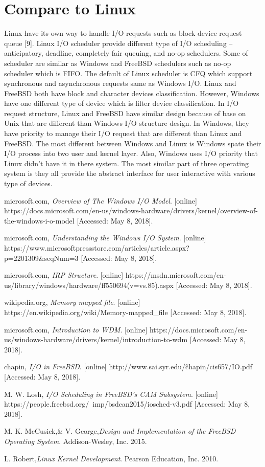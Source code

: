 \documentclass[letterpaper,draftclsnofoot,journal,compsoc,10pt,onecolumn]{IEEEtran}
\begin{document}
\section{Compare to Linux}
\indent Linux have its own way to handle I/O requests such as block device request queue [9]. Linux I/O scheduler provide different type of I/O scheduling – anticipatory, deadline, completely fair queuing, and no-op schedulers. Some of scheduler are similar as Windows and FreeBSD schedulers such as no-op scheduler which is FIFO. The default of Linux scheduler is CFQ which support synchronous and asynchronous requests same as Windows I/O. Linux and FreeBSD both have block and character devices classification. However, Windows have one different type of device which is filter device classification. In I/O request structure, Linux and FreeBSD have similar design because of base on Unix that are different than Windows I/O structure design. In Windows, they have priority to manage their I/O request that are different than Linux and FreeBSD. The most different between Windows and Linux is Windows spate their I/O process into two user and kernel layer. Also, Windows uses I/O priority that Linux didn’t have it in there system. The most similar part of three operating system is they all provide the abstract interface for user interactive with various type of devices.
   
\newpage
\begin{thebibliography}{14}

microsoft.com, \textit{Overview of The Windows I/O Model}. [online] https://docs.microsoft.com/en-us/windows-hardware/drivers/kernel/overview-of-the-windows-i-o-model [Accessed: May 8, 2018].

microsoft.com, \textit{Understanding the Windows I/O System}. [online]  https://www.microsoftpressstore.com/articles/article.aspx?p=2201309\&seqNum=3 [Accessed: May 8, 2018].

microsoft.com, \textit{IRP Structure}. [online]  https://msdn.microsoft.com/en-us/library/windows/hardware/ff550694(v=vs.85).aspx [Accessed: May 8, 2018].

wikipedia.org, \textit{Memory mapped file}. [online]  https://en.wikipedia.org/wiki/Memory-mapped\_file [Accessed: May 8, 2018].

microsoft.com, \textit{Introduction to WDM}. [online]  https://docs.microsoft.com/en-us/windows-hardware/drivers/kernel/introduction-to-wdm [Accessed: May 8, 2018].

chapin, \textit{I/O in FreeBSD}. [online]  http://www.sai.syr.edu/\~chapin/cis657/IO.pdf [Accessed: May 8, 2018].

M. W. Losh, \textit{I/O Scheduling in FreeBSD’s CAM Subsystem}. [online]  https://people.freebsd.org/~imp/bsdcan2015/iosched-v3.pdf [Accessed: May 8, 2018].

M. K. McCusick,\& V. George,\textit{Design and Implementation of the FreeBSD Operating System}.  Addison-Wesley, Inc. 2015.

L. Robert,\textit{Linux Kernel Development}. Pearson Education, Inc. 2010.


\end{thebibliography}
\end{document}
